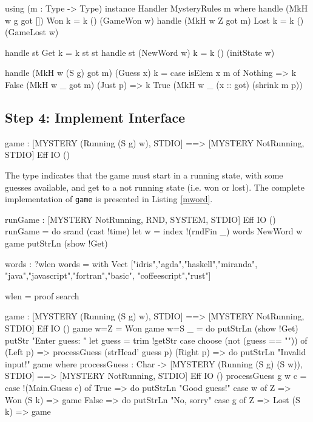 \begin{code}
using (m : Type -> Type)
  instance Handler MysteryRules m where
    handle (MkH w g got []) Won k = k () (GameWon w)
    handle (MkH w Z got m) Lost k = k () (GameLost w)
  
    handle st Get k = k st st
    handle st (NewWord w) k = k () (initState w)
  
    handle (MkH w (S g) got m) (Guess x) k =
        case isElem x m of
             Nothing => k False (MkH w _ got m)
             (Just p) => k True (MkH w _ (x :: got) (shrink m p))
\end{code}

\subsection{Step 4: Implement Interface}

\begin{code}
game : { [MYSTERY (Running (S g) w), STDIO] ==>
         [MYSTERY NotRunning, STDIO] } Eff IO ()
\end{code}

\noindent
The type indicates that the game must start in a running state, with some
guesses available, and get to a not running state (i.e. won or lost). 
The complete implementation of \texttt{game} is presented in Listing
\ref{mword}.

\begin{code}
runGame : { [MYSTERY NotRunning, RND, SYSTEM, STDIO] } Eff IO ()
runGame = do srand (cast !time)
             let w = index !(rndFin _) words
             NewWord w
             game
             putStrLn (show !Get)
\end{code}

\begin{code}
words : ?wlen
words = with Vect ["idris","agda","haskell","miranda",
         "java","javascript","fortran","basic",
         "coffeescript","rust"]
  
wlen = proof search
\end{code}

\begin{code}[float=h,frame=single,caption={Mystery Word Game Implementation},label=mword]
game : { [MYSTERY (Running (S g) w), STDIO] ==>
         [MYSTERY NotRunning, STDIO] } Eff IO ()
game {w=Z} = Won
game {w=S _}
     = do putStrLn (show !Get)
          putStr "Enter guess: "
          let guess = trim !getStr
          case choose (not (guess == "")) of
               (Left p) => processGuess (strHead' guess p)
               (Right p) => do putStrLn "Invalid input!"
                               game
  where
    processGuess : Char -> { [MYSTERY (Running (S g) (S w)), STDIO] ==>
                             [MYSTERY NotRunning, STDIO] }
                           Eff IO ()
    processGuess {g} {w} c
      = case !(Main.Guess c) of
             True => do putStrLn "Good guess!"
                        case w of
                             Z => Won
                             (S k) => game
             False => do putStrLn "No, sorry"
                         case g of
                              Z => Lost
                              (S k) => game
\end{code}



